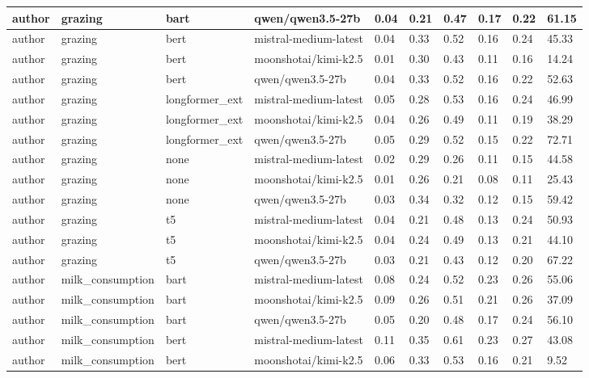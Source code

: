 \begin{tabular}{|l|l|l|l|l|l|l|l|l|l|}
 \hline
 author & grazing & bart & qwen/qwen3.5-27b & 0.04 & 0.21 & 0.47 & 0.17 & 0.22 & 61.15 \\
 \hline
 author & grazing & bert & mistral-medium-latest & 0.04 & 0.33 & 0.52 & 0.16 & 0.24 & 45.33 \\
 \hline
 author & grazing & bert & moonshotai/kimi-k2.5 & 0.01 & 0.30 & 0.43 & 0.11 & 0.16 & 14.24 \\
 \hline
 author & grazing & bert & qwen/qwen3.5-27b & 0.04 & 0.33 & 0.52 & 0.16 & 0.22 & 52.63 \\
 \hline
 author & grazing & longformer\_ext & mistral-medium-latest & 0.05 & 0.28 & 0.53 & 0.16 & 0.24 & 46.99 \\
 \hline
 author & grazing & longformer\_ext & moonshotai/kimi-k2.5 & 0.04 & 0.26 & 0.49 & 0.11 & 0.19 & 38.29 \\
 \hline
 author & grazing & longformer\_ext & qwen/qwen3.5-27b & 0.05 & 0.29 & 0.52 & 0.15 & 0.22 & 72.71 \\
 \hline
 author & grazing & none & mistral-medium-latest & 0.02 & 0.29 & 0.26 & 0.11 & 0.15 & 44.58 \\
 \hline
 author & grazing & none & moonshotai/kimi-k2.5 & 0.01 & 0.26 & 0.21 & 0.08 & 0.11 & 25.43 \\
 \hline
 author & grazing & none & qwen/qwen3.5-27b & 0.03 & 0.34 & 0.32 & 0.12 & 0.15 & 59.42 \\
 \hline
 author & grazing & t5 & mistral-medium-latest & 0.04 & 0.21 & 0.48 & 0.13 & 0.24 & 50.93 \\
 \hline
 author & grazing & t5 & moonshotai/kimi-k2.5 & 0.04 & 0.24 & 0.49 & 0.13 & 0.21 & 44.10 \\
 \hline
 author & grazing & t5 & qwen/qwen3.5-27b & 0.03 & 0.21 & 0.43 & 0.12 & 0.20 & 67.22 \\
 \hline
 author & milk\_consumption & bart & mistral-medium-latest & 0.08 & 0.24 & 0.52 & 0.23 & 0.26 & 55.06 \\
 \hline
 author & milk\_consumption & bart & moonshotai/kimi-k2.5 & 0.09 & 0.26 & 0.51 & 0.21 & 0.26 & 37.09 \\
 \hline
 author & milk\_consumption & bart & qwen/qwen3.5-27b & 0.05 & 0.20 & 0.48 & 0.17 & 0.24 & 56.10 \\
 \hline
 author & milk\_consumption & bert & mistral-medium-latest & 0.11 & 0.35 & 0.61 & 0.23 & 0.27 & 43.08 \\
 \hline
 author & milk\_consumption & bert & moonshotai/kimi-k2.5 & 0.06 & 0.33 & 0.53 & 0.16 & 0.21 & 9.52 \\

\end{tabular}
